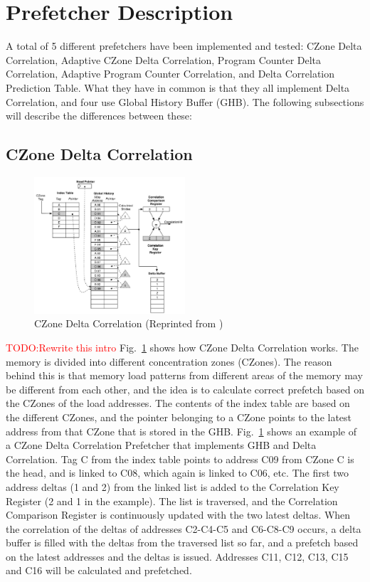 \documentclass[a4paper]{IEEEtran}
\newcommand\TODO[1]{\textcolor{red}{TODO:#1}}
\newcommand\todo[1]{\TODO{#1}}
\begin{document}
\section{Prefetcher Description}

A total of 5 different prefetchers have been implemented and tested: CZone Delta Correlation, Adaptive CZone Delta Correlation, Program Counter Delta Correlation, Adaptive Program Counter Correlation, and Delta Correlation Prediction Table. 
What they have in common is that they all implement Delta Correlation, and four use Global History Buffer (GHB). 
The following subsections will describe the differences between these:

\subsection{CZone Delta Correlation}

\begin{figure}[!ht]
  \centering
      \includegraphics[width=0.5\textwidth]{Figures/CDC}
  \caption{CZone Delta Correlation (Reprinted from \protect\cite{acdc})}
  \label{fig:CDC}
\end{figure}

\todo{Rewrite this intro}
Fig.~\ref{fig:CDC} shows how CZone Delta Correlation works. 
The memory is divided into different concentration zones (CZones). 
The reason behind this is that memory load patterns from different areas of the memory may be different from each other, and the idea is to calculate correct prefetch based on the CZones of the load addresses.
The contents of the index table are based on the different CZones, and the pointer belonging to a CZone points to the latest address from that CZone that is stored in the GHB.
Fig.~\ref{fig:CDC} shows an example of a CZone Delta Correlation Prefetcher that implements GHB and Delta Correlation. 
Tag C from the index table points to address C09 from CZone C is the head, and is linked to C08,  which again is linked to C06, etc. 
The first two address deltas (1 and 2) from the linked list is added to the Correlation Key Register (2 and 1 in the example). 
The list is traversed, and the Correlation Comparison Register is continuously updated with the two latest deltas. 
When the correlation of the deltas of addresses C2-C4-C5 and C6-C8-C9  occurs, a delta buffer is filled with the deltas from the traversed list so far, and a prefetch based on the latest addresses and the deltas is issued.
Addresses C11, C12, C13, C15 and C16 will be calculated and prefetched.
 
\end{document}
